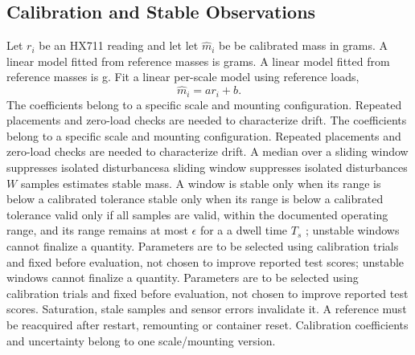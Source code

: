 \documentclass[conference]{IEEEtran}
\providecommand{\DIFadd}[1]{{\protect\color{blue} \sf #1}} %
\providecommand{\DIFdel}[1]{{\protect\color{red} \ifmmode #1\else\scriptsize #1\fi}} %
\providecommand{\DIFaddbegin}{} %
\providecommand{\DIFaddend}{} %
\providecommand{\DIFdelbegin}{} %
\providecommand{\DIFdelend}{} %
\begin{document}
\subsection{Calibration and Stable Observations}
Let $r_i$ be an HX711 reading and \DIFdelbegin \DIFdel{let }\DIFdelend $\hat m_i$ \DIFdelbegin \DIFdel{be }\DIFdelend calibrated mass in \DIFdelbegin \DIFdel{grams. A linear model fitted from reference masses is
}\DIFdelend \DIFaddbegin \DIFadd{g. Fit a linear per-scale model using reference loads,
}\DIFaddend \begin{equation}\hat m_i=a r_i+b.\label{eq:calibration}\end{equation}
\DIFdelbegin \DIFdel{The coefficients belong to a specific scale and mounting configuration. Repeated placements and zero-load checks are needed to characterize drift. }\DIFdelend A median over \DIFdelbegin \DIFdel{a sliding window suppresses isolated disturbances}\DIFdelend \DIFaddbegin \DIFadd{$W$ samples estimates stable mass}\DIFaddend . A window is \DIFdelbegin \DIFdel{stable only when its range is below a calibrated tolerance }\DIFdelend \DIFaddbegin \DIFadd{valid only if all samples are valid, within the documented operating range, and its range remains at most }\DIFaddend $\epsilon$ for \DIFdelbegin \DIFdel{a }\DIFdelend dwell time $T_s$\DIFdelbegin \DIFdel{; unstable windows cannot finalize a quantity. Parameters are to be selected using calibration trials and fixed before evaluation, not chosen to improve reported test scores}\DIFdelend . \DIFaddbegin \DIFadd{Saturation, stale samples and sensor errors invalidate it. A reference must be reacquired after restart, remounting or container reset. Calibration coefficients and uncertainty belong to one scale/mounting version.
}\DIFaddend 
\end{document}
